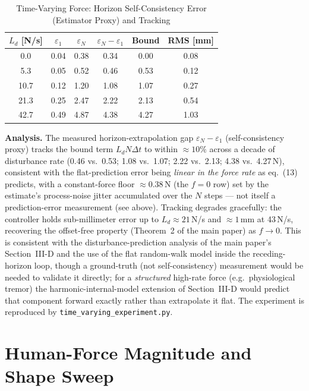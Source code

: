\documentclass[journal]{IEEEtran}
\begin{document}
\begin{table}[!t]
\caption{Time-Varying Force: Horizon Self-Consistency Error (Estimator
Proxy) and Tracking}
\label{tab:tv}
\renewcommand{\arraystretch}{1.0}
\footnotesize
\setlength{\tabcolsep}{3pt}
\begin{tabular}{cccccc}
\toprule
$L_d$ [N/s] & $\varepsilon_1$ & $\varepsilon_N$ & $\varepsilon_N{-}\varepsilon_1$ & Bound & RMS [mm]\\
\midrule
0.0  & 0.04 & 0.38 & 0.34 & 0.00 & 0.08\\
5.3  & 0.05 & 0.52 & 0.46 & 0.53 & 0.12\\
10.7 & 0.12 & 1.20 & 1.08 & 1.07 & 0.27\\
21.3 & 0.25 & 2.47 & 2.22 & 2.13 & 0.54\\
42.7 & 0.49 & 4.87 & 4.38 & 4.27 & 1.03\\
\bottomrule
\end{tabular}
\end{table}

\textbf{Analysis.} The measured horizon-extrapolation gap
$\varepsilon_N-\varepsilon_1$ (self-consistency proxy) tracks the bound
term $L_dN\Delta t$ to within $\approx10\%$ across a decade of
disturbance rate (0.46 vs.\ 0.53; 1.08 vs.\ 1.07; 2.22 vs.\ 2.13; 4.38
vs.\ 4.27\,N), consistent with the flat-prediction error being
\emph{linear in the force rate} as eq.~(13) predicts, with a
constant-force floor $\approx0.38$\,N (the $f=0$ row) set by the
estimate's process-noise jitter accumulated over the $N$ steps --- not
itself a prediction-error measurement (see above). Tracking degrades
gracefully: the controller holds sub-millimeter error up to
$L_d\approx21$\,N/s and $\approx1$\,mm at 43\,N/s, recovering the
offset-free property (Theorem~2 of the main paper) as $f\to0$. This is
consistent with the disturbance-prediction analysis of the main paper's
Section~III-D and the use of the flat random-walk model inside the
receding-horizon loop, though a ground-truth (not self-consistency)
measurement would be needed to validate it directly; for a
\emph{structured} high-rate force (e.g.\ physiological tremor) the
harmonic-internal-model extension of Section~III-D would predict that
component forward exactly rather than extrapolate it flat. The
experiment is reproduced by \texttt{time\_varying\_experiment.py}.

\section{Human-Force Magnitude and Shape Sweep}\label{sec:forcesweep}
\end{document}
